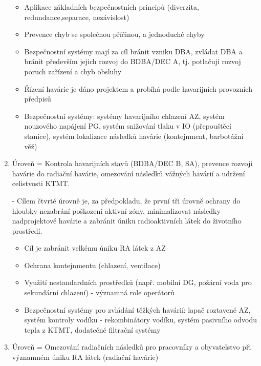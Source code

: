 \begin{enumerate}
\begin{itemize}
            \item Aplikace základních bezpečnostních principů (diverzita, redundance,separace, nezávislost)

            \item Prevence chyb se společnou příčinou, a jednoduché chyby

            \item Bezpečnostní systémy mají za cíl bránit vzniku DBA, zvládat DBA a bránit především jejich rozvoj do BDBA/DEC A, tj. potlačují rozvoj poruch zařízení a chyb obsluhy

            \item Řízení havárie je dáno projektem a probíhá podle havarijních provozních předpisů

            \item Bezpečnostní systémy: systémy havarijního chlazení AZ, systém nouzového napájení PG, systém snižování tlaku v IO (přepouštěcí stanice), systém lokalizace následků havárie (kontejnment, barbotážní věž)
        \end{itemize}

        \item Úroveň = Kontrola havarijních stavů (BDBA/DEC B, SA), prevence rozvoji havárie do radiační havárie, omezování následků vážných havárií a udržení celistvosti KTMT.

        - Cílem čtvrté úrovně je, za předpokladu, že první
tři úrovně ochrany do hloubky nezabrání poškození aktivní zóny, minimalizovat následky nadprojektové havárie a zabránit úniku radioaktivních látek do životního prostředí. 


        \begin{itemize}
            \item Cíl je zabránit velkému úniku RA látek z AZ

            \item Ochrana kontejnmentu (chlazení, ventilace)

            \item Využití nestandardních prostředků (např. mobilní DG, požární voda pro sekundární chlazení) - významná role operátorů

            \item Bezpečnostní systémy pro zvládání těžkých havárií: lapač roztavené AZ, systém kontroly vodíku - rekombinátory vodíku, systém pasivního odvodu tepla z KTMT, dodatečné filtrační systémy
            
        \end{itemize}
\clearpage
    \item Úroveň =  Omezování radiačních následků pro pracovníky a obyvatelstvo při významném úniku RA látek (radiační havárie)


\end{enumerate}

